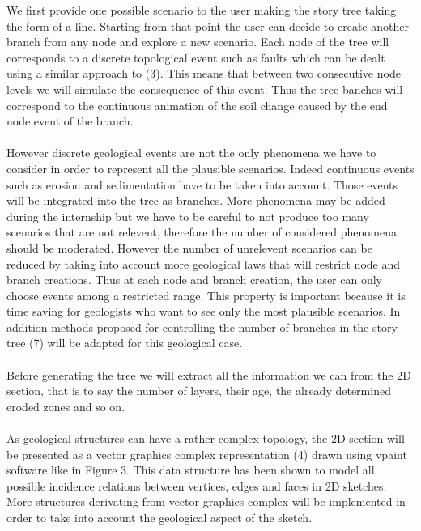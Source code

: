 \documentclass[12pt, a4paper]{memoir} %
\begin{document}
We first provide one possible scenario to the user making the story tree taking the form of a line. Starting from that point the user can decide to create another branch from any node and explore a new scenario. Each node of the tree will corresponds to a discrete topological event such as faults which can be dealt using a similar approach to (3). This means that between two consecutive node levels we will simulate the consequence of this event. Thus the tree banches will correspond to the continuous animation of the soil change caused by the end node event of the branch.\\\\

However discrete geological events are not the only phenomena we have to consider in order to represent all the plausible scenarios. Indeed continuous events such as erosion and sedimentation have to be taken into account. Those events will be integrated into the tree as branches.
More phenomena may be added during the internship but we have to be careful to not produce too many scenarios that are not relevent, therefore the number of considered phenomena should be moderated. However the number of unrelevent scenarios can be reduced by taking into account more geological laws that will restrict node and branch creations.
Thus at each node and branch creation, the user can only choose events among a restricted range. This property is important because it is time saving for geologists who want to see only the most plausible scenarios. In addition methods proposed for controlling the number of branches in the story tree (7) will be adapted for this geological case.\\\\

Before generating the tree we will extract all the information we can from the 2D section, that is to say the number of layers, their age, the already determined eroded zones and so on.\\\\

As geological structures can have a rather complex topology, the 2D section will be presented as a vector graphics complex representation (4) drawn using vpaint software like in Figure 3. This data structure has been shown to model all possible incidence relations between vertices, edges and faces in 2D sketches. More structures derivating from vector graphics complex will be implemented in order to take into account the geological aspect of the sketch.\\\\
\end{document}
